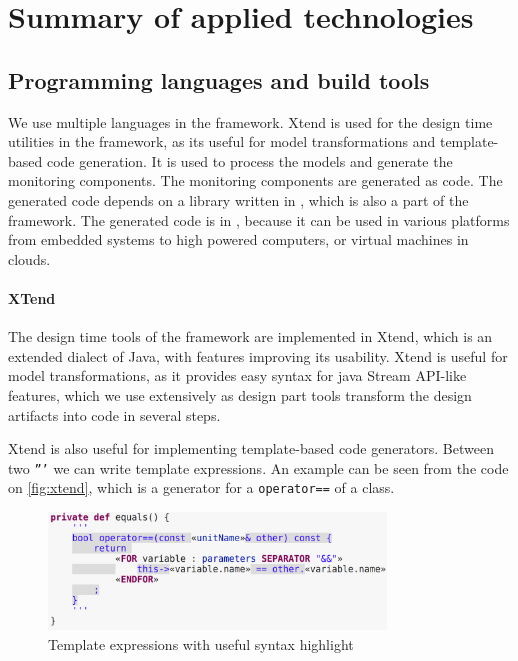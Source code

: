 \chapter{Summary of applied technologies}

\section{Programming languages and build tools}

We use multiple languages in the framework. 
Xtend is used for the design time utilities in the framework, as its useful for model transformations and template-based code generation.
It is used to process the models and generate the monitoring components. 
The monitoring components are generated as \cpp{} code.
The generated code depends on a library written in \cpp{}, which is also a part of the framework.
The generated code is in \cpp{}, because it can be used in various platforms from embedded systems to high powered computers, or virtual machines in clouds.


\subsubsection{XTend}
The design time tools of the framework are implemented in Xtend\cite{xtend}, which is an extended dialect of Java, with features improving its usability.
Xtend is useful for model transformations, as it provides easy syntax for java Stream API-like features, which we use extensively as design part tools transform the design artifacts into code in several steps.

Xtend is also useful for implementing template-based code generators. 
Between two \texttt{'''} we can write template expressions.
An example can be seen from the code on \autoref{fig:xtend}, which is a generator for a \cpp{} \texttt{operator==} of a class.


\begin{figure}[H]
	\begin{center}
		\includegraphics[width=0.8\textwidth]{figures/xtend.png}
		\caption{Template expressions with useful syntax highlight }
		\label{fig:xtend}
	\end{center}
\end{figure}

